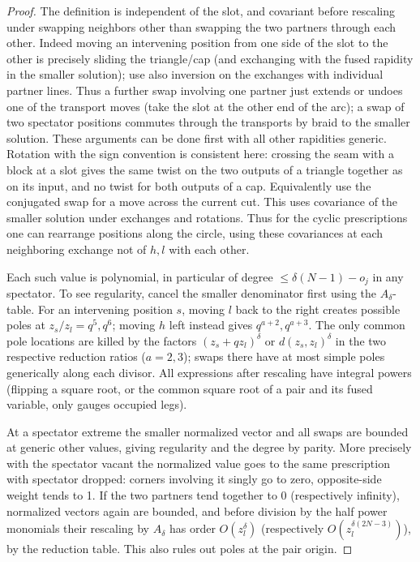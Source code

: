 \begin{proof}
The definition is independent of the slot, and covariant before rescaling under swapping neighbors other than swapping the two partners through each other. Indeed moving an intervening position from one side of the slot to the other is precisely sliding the triangle/cap (and exchanging with the fused rapidity in the smaller solution); use also inversion on the exchanges with individual partner lines. Thus a further swap involving one partner just extends or undoes one of the transport moves (take the slot at the other end of the arc); a swap of two spectator positions commutes through the transports by braid to the smaller solution. These arguments can be done first with all other rapidities generic. Rotation with the sign convention is consistent here: crossing the seam with a block at a slot gives the same twist on the two outputs of a triangle together as on its input, and no twist for both outputs of a cap. Equivalently use the conjugated swap for a move across the current cut. This uses covariance of the smaller solution under exchanges and rotations. Thus for the cyclic prescriptions one can rearrange positions along the circle, using these covariances at each neighboring exchange not of \(h,l\) with each other.

Each such value is polynomial, in particular of degree \(\le\delta(N-1)-o_j\) in any spectator. To see regularity, cancel the smaller denominator first using the \(A_\delta\)-table. For an intervening position \(s\), moving \(l\) back to the right creates possible poles at \(z_s/z_l=q^5,q^6\); moving \(h\) left instead gives \(q^{a+2},q^{a+3}\). The only common pole locations are killed by the factors \((z_s+q z_l)^\delta\) or \(d(z_s,z_l)^\delta\) in the two respective reduction ratios (\(a=2,3\)); swaps there have at most simple poles generically along each divisor. All expressions after rescaling have integral powers (flipping a square root, or the common square root of a pair and its fused variable, only gauges occupied legs). 

At a spectator extreme the smaller normalized vector and all swaps are bounded at generic other values, giving regularity and the degree by parity. More precisely with the spectator vacant the normalized value goes to the same prescription with spectator dropped: corners involving it singly go to zero, opposite-side weight tends to 1. If the two partners tend together to 0 (respectively infinity), normalized vectors again are bounded, and before division by the half power monomials their rescaling by \(A_\delta\) has order \(O(z_l^\delta)\) (respectively \(O(z_l^{\delta(2N-3)})\)), by the reduction table. This also rules out poles at the pair origin.


\end{proof}
